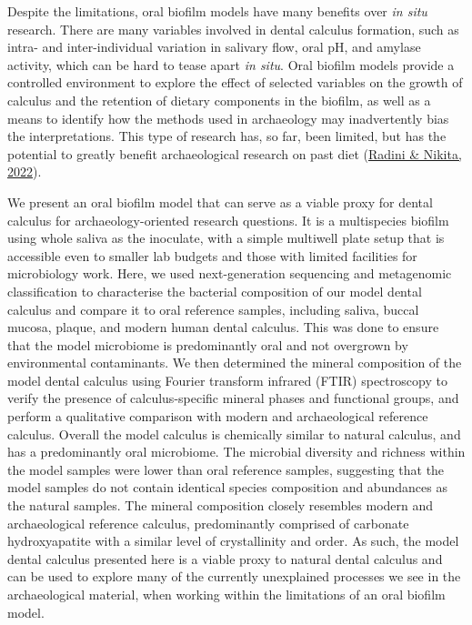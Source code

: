 \documentclass[
  letterpaper,
]{book}
\begin{document}
Despite the limitations, oral biofilm models have many benefits over
\emph{in situ} research. There are many variables involved in dental
calculus formation, such as intra- and inter-individual variation in
salivary flow, oral pH, and amylase activity, which can be hard to tease
apart \emph{in situ}. Oral biofilm models provide a controlled
environment to explore the effect of selected variables on the growth of
calculus and the retention of dietary components in the biofilm, as well
as a means to identify how the methods used in archaeology may
inadvertently bias the interpretations. This type of research has, so
far, been limited, but has the potential to greatly benefit
archaeological research on past diet
(\protect\hyperlink{ref-radiniDirtyTeeth2022}{Radini \& Nikita, 2022}).

We present an oral biofilm model that can serve as a viable proxy for
dental calculus for archaeology-oriented research questions. It is a
multispecies biofilm using whole saliva as the inoculate, with a simple
multiwell plate setup that is accessible even to smaller lab budgets and
those with limited facilities for microbiology work. Here, we used
next-generation sequencing and metagenomic classification to
characterise the bacterial composition of our model dental calculus and
compare it to oral reference samples, including saliva, buccal mucosa,
plaque, and modern human dental calculus. This was done to ensure that
the model microbiome is predominantly oral and not overgrown by
environmental contaminants. We then determined the mineral composition
of the model dental calculus using Fourier transform infrared (FTIR)
spectroscopy to verify the presence of calculus-specific mineral phases
and functional groups, and perform a qualitative comparison with modern
and archaeological reference calculus. Overall the model calculus is
chemically similar to natural calculus, and has a predominantly oral
microbiome. The microbial diversity and richness within the model
samples were lower than oral reference samples, suggesting that the
model samples do not contain identical species composition and
abundances as the natural samples. The mineral composition closely
resembles modern and archaeological reference calculus, predominantly
comprised of carbonate hydroxyapatite with a similar level of
crystallinity and order. As such, the model dental calculus presented
here is a viable proxy to natural dental calculus and can be used to
explore many of the currently unexplained processes we see in the
archaeological material, when working within the limitations of an oral
biofilm model.
\end{document}

